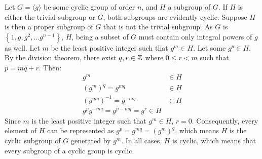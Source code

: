 \documentclass{article}
\begin{document}
Let $G = \langle g \rangle$ be some cyclic group of order $n$, and $H$ a subgroup of $G$. If $H$ is either the trivial subgroup or $G$, both subgroups are evidently cyclic. Suppose $H$ is then a proper subgroup of $G$ that is not the trivial subgroup. As $G$ is $\left\{1, g, g^2, \ldots g^{n-1}\right\}$, $H$, being a subset of $G$ must contain only integral powers of $g$ as well. Let $m$ be the least positive integer such that $g^m \in H$. Let some $g^p \in H$. By the division theorem, there exist $q, r \in \mathbb{Z}$ where $0 \leq r < m$ such that $p = mq + r$. Then:
\begin{equation}
    \begin{split}
        g^m & \in H \\
        \left(g^{m}\right)^q = g^{mq} & \in H \\
        \left(g^{mq}\right)^{-1} = g^{-mq} & \in H \\
        g^{p}g^{-mq} = g^{p-mq} = g^r \in H
    \end{split}
\end{equation}
Since $m$ is the least positive integer such that $g^m \in H$, $r = 0$. Consequently, every element of $H$ can be represented as $g^p = g^{mq} = \left(g^m\right)^q$, which means $H$ is the cyclic subgroup of $G$ generated by $g^m$. In all cases, $H$ is cyclic, which means that every subgroup of a cyclic group is cyclic.

\clearpage

\end{document}
